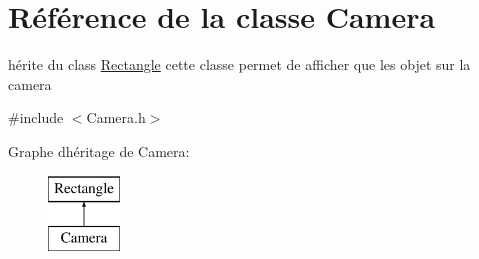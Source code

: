 \hypertarget{class_camera}{}\section{Référence de la classe Camera}
\label{class_camera}


hérite du class \mbox{\hyperlink{class_rectangle}{Rectangle}} cette classe permet de afficher que les objet sur la camera  




{\ttfamily \#include $<$Camera.\+h$>$}

Graphe d\textquotesingle{}héritage de Camera\+:\begin{figure}[H]
\begin{center}
\leavevmode
\includegraphics[height=2.000000cm]{class_camera}
\end{center}
\end{figure}
